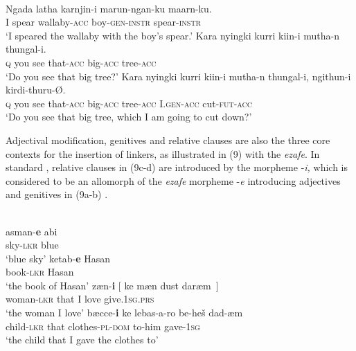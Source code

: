 \documentclass[output=paper]{langsci/langscibook}
\begin{document}
\ea%
      \citep[47]{Richards2013}\label{ex:manzini:8}\\
    \ea
    \gll Ngada latha   karnjin-i   marun-ngan-ku   maarn-ku.     \\
         I   spear   wallaby-\textsc{acc} boy-\textsc{gen-instr}  spear-\textsc{instr} \\
    \glt ‘I speared the wallaby with the boy’s spear.’
    \ex
    \gll Kara   nyingki   kurri   kiin-i     mutha-n   thungal-i. \\
         \textsc{q}    you     see   that-\textsc{acc}    big-\textsc{acc}    tree\textsc{{}-acc} \\
    \glt ‘Do you see that big tree?’
    \ex
    \gll Kara   nyingki kurri kiin-i     mutha-n thungal-i,   ngithun-i kirdi-thuru-Ø. \\
         \textsc{q}  you     see   that-\textsc{acc}    big-\textsc{acc}   tree-\textsc{acc}    I.\textsc{gen-acc}  cut-\textsc{fut-acc} \\
    \glt ‘Do you see that big tree, which I am going to cut down?’
    \z
\z

Adjectival modification, genitives and relative clauses are also the three core contexts for the insertion of linkers, as illustrated in (9) with the  \textit{ezafe}. In standard , relative clauses in (9c-d) are introduced by the morpheme -\textit{i,} which is considered to be an allomorph of the \textit{ezafe} morpheme -\textit{e} introducing adjectives and genitives in (9a-b) \citep{Samvelian2007}.

\ea%
    \label{ex:manzini:9}\\
    \ea
    \gll asman-\textbf{e}   abi     \\
         sky-\textsc{lkr}    blue\\
    \glt ‘blue sky’        
    \ex  
    \gll ketab-\textbf{e}   Hasan   \\
         book-\textsc{lkr}    Hasan\\
    \glt ‘the book of Hasan’ 
    \ex  
    \gll zæn-\textbf{i}     [ ke  mæn  dust  daræm~]\\
         woman-\textsc{lkr} {}  that   I   love  give.\textsc{1sg.prs}\\
    \glt ‘the woman I love’
    \ex
    \gll bæcce-\textbf{i}   ke   lebas-a-ro     be-heš dad-æm\\
         child-\textsc{lkr}    that   clothes-\textsc{pl-dom}    to-him gave-\textsc{1sg} \\
    \glt ‘the child that I gave the clothes to’
    \z
\z
\end{document}
